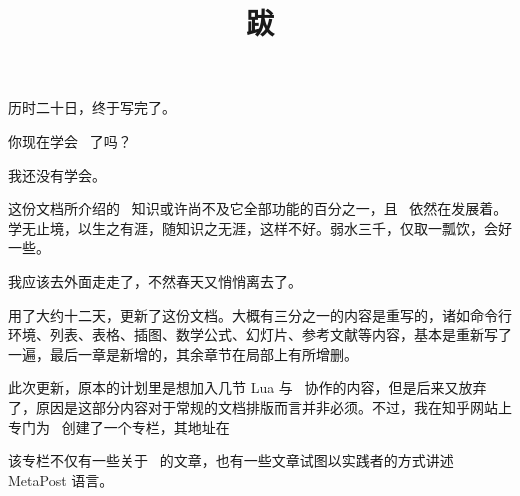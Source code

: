 \title{跋}

历时二十日，终于写完了。

你现在学会 \CONTEXT\ 了吗？

我还没有学会。

这份文档所介绍的 \CONTEXT\ 知识或许尚不及它全部功能的百分之一，且 \CONTEXT\ 依然在发展着。学无止境，以生之有涯，随知识之无涯，这样不好。弱水三千，仅取一瓢饮，会好一些。

我应该去外面走走了，不然春天又悄悄离去了。

\blank[line]
\midaligned{\hl[8]}
\blank[line]

\indentation 用了大约十二天，更新了这份文档。大概有三分之一的内容是重写的，诸如命令行环境、列表、表格、插图、数学公式、幻灯片、参考文献等内容，基本是重新写了一遍，最后一章是新增的，其余章节在局部上有所增删。

此次更新，原本的计划里是想加入几节 Lua 与 \CONTEXT\ 协作的内容，但是后来又放弃了，原因是这部分内容对于常规的文档排版而言并非必须。不过，我在知乎网站上专门为 \CONTEXT\ 创建了一个专栏，其地址在

\midaligned{\boxquote{\from[zhuanlan]}}

\noindent 该专栏不仅有一些关于 \CONTEXT\ 的文章，也有一些文章试图以实践者的方式讲述 MetaPost 语言。

\blank[line]

